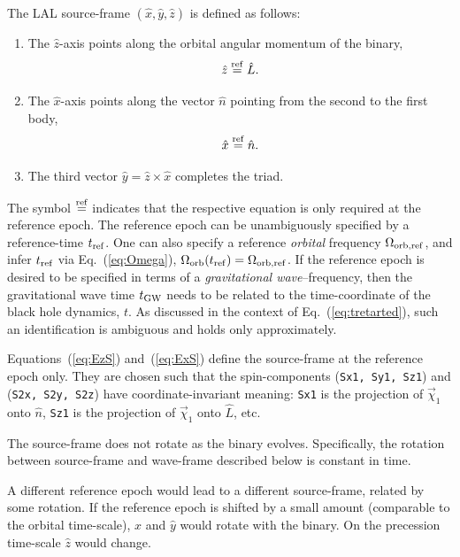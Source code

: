\documentclass[11pt,tightenlines,article,amssymb,amsmath,amsfonts,superscriptaddress,nofootinbib]{revtex4}
\newcommand{\nNR}{\hat{n}}
\newcommand{\lNR}{\hat L}
\newcommand{\tGW}{t_{\rm GW}}
\newcommand{\ExS}{{{\hat x}}}
\newcommand{\EyS}{{{\hat y}}}
\newcommand{\EzS}{{{\hat z}}}
\newcommand{\phiRef}{\Phi} %
\newcommand{\equalref}{\overset{\rm ref}{=}}
\begin{document}
The LAL source-frame $(\ExS, \EyS, \EzS)$ is defined as follows:
\begin{enumerate}
\item The $\EzS$-axis points along the orbital angular momentum of the binary,
  \begin{equation}\label{eq:EzS}
    \EzS\equalref \lNR.
  \end{equation}
\item The $\ExS$-axis points along the vector $\nNR$ pointing from the second
  to the first body,
  \begin{equation}\label{eq:ExS}
    \ExS\equalref\nNR.
  \end{equation}
\item The third vector $\EyS=\EzS\times\ExS$ completes the triad.
\end{enumerate}
The symbol $\equalref$ indicates that the
respective equation is only required at the reference epoch.  The
reference epoch can be unambiguously specified by a reference-time
$t_{\rm ref}$.  One can also specify a reference \emph{orbital}
frequency $\Omega_{\rm orb,ref}$, and infer $t_{\rm ref}$ via
Eq.~(\ref{eq:Omega}), $\Omega_{\rm orb}(t_{\rm ref})=\Omega_{\rm orb, ref}$.  If the
reference epoch is desired to be specified in terms of a
\emph{gravitational wave}--frequency, then the gravitational wave time
$\tGW$ needs to be related to the time-coordinate of the black hole
dynamics, $t$.  As discussed in the context of
Eq.~(\ref{eq:tretarted}), such an identification is ambiguous and
holds only approximately.

Equations~(\ref{eq:EzS}) and~(\ref{eq:ExS}) define the source-frame at
the reference epoch only.  They are chosen such that the
spin-components ({\tt Sx1, Sy1, Sz1}) and ({\tt S2x, S2y, S2z}) have
coordinate-invariant meaning: {\tt Sx1} is the projection of
$\vec\chi_1$ onto $\nNR$, {\tt Sz1} is the projection of $\vec\chi_1$
onto $\lNR$, etc.

The source-frame does not rotate as the binary evolves.  Specifically,
the rotation between source-frame and wave-frame described below is
constant in time.

A different reference epoch would lead to a different source-frame,
related by some rotation.  If the reference epoch is shifted by a
small amount (comparable to the orbital time-scale), $\ExS$ and $\EyS$
would rotate with the binary.  On the precession time-scale $\EzS$
would change.
\end{document}

